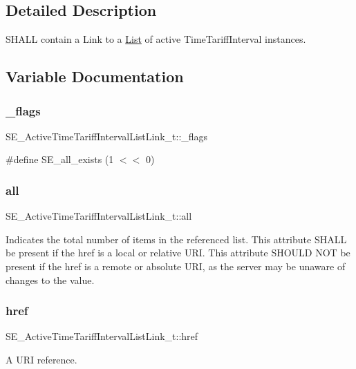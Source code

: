 \subsection{Detailed Description}
S\+H\+A\+LL contain a Link to a \hyperlink{structList}{List} of active Time\+Tariff\+Interval instances. 

\subsection{Variable Documentation}
\mbox{\label{group__ActiveTimeTariffIntervalListLink_gae4afe7d01ef64164fb20d662e4447095}} 
\subsubsection{\texorpdfstring{\+\_\+flags}{\_flags}}
{\footnotesize\ttfamily S\+E\+\_\+\+Active\+Time\+Tariff\+Interval\+List\+Link\+\_\+t\+::\+\_\+flags}

\#define S\+E\+\_\+all\+\_\+exists (1 $<$$<$ 0) \mbox{\label{group__ActiveTimeTariffIntervalListLink_ga155419b00dbfbeda38b3b4a8a06f2b16}} 
\subsubsection{\texorpdfstring{all}{all}}
{\footnotesize\ttfamily S\+E\+\_\+\+Active\+Time\+Tariff\+Interval\+List\+Link\+\_\+t\+::all}

Indicates the total number of items in the referenced list. This attribute S\+H\+A\+LL be present if the href is a local or relative U\+RI. This attribute S\+H\+O\+U\+LD N\+OT be present if the href is a remote or absolute U\+RI, as the server may be unaware of changes to the value. \mbox{\label{group__ActiveTimeTariffIntervalListLink_ga1feb971d205d4f4f6e5fff8067e12a08}} 
\subsubsection{\texorpdfstring{href}{href}}
{\footnotesize\ttfamily S\+E\+\_\+\+Active\+Time\+Tariff\+Interval\+List\+Link\+\_\+t\+::href}

A U\+RI reference. 